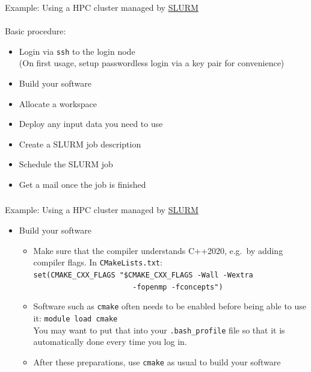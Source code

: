 \documentclass[utf8,stillsansserifmath,fleqn,t]{beamer}
\newcommand{\code}[1]{\texttt{#1}}
\begin{document}
\begin{frame}
\frametitle{\insertsection}
Example: Using a HPC cluster managed by
\href{https://slurm.schedmd.com/}{SLURM}\\
~\\
Basic procedure:
\begin{itemize}
\item Login via \code{ssh} to the login node\\
    (On first usage, setup passwordless login via a key pair for convenience)
\item Build your software
\item Allocate a workspace
\item Deploy any input data you need to use
\item Create a SLURM job description
\item Schedule the SLURM job
\item Get a mail once the job is finished
\end{itemize}
\end{frame}

\begin{frame}
\frametitle{\insertsection}
Example: Using a HPC cluster managed by
\href{https://slurm.schedmd.com/}{SLURM}
\begin{itemize}
\item Build your software
    \begin{itemize}
    \item Make sure that the compiler understands C++2020, e.g.~by adding
    compiler flags. In
    \code{CMakeLists.txt}:\\
    \code{set(CMAKE\_CXX\_FLAGS "\${CMAKE\_CXX\_FLAGS} -Wall -Wextra}\\
    \code{~~~~~~~~~~~~~~~~~~~~~~~-fopenmp -fconcepts")}
\item Software such as \code{cmake} often needs to be enabled before being able
to use it:
    \code{module load cmake}\\
    You may want to put that into your \code{.bash\_profile} file so that it is
    automatically done every time you log in.
\item After these preparations, use \code{cmake} as usual to build your software 
\end{itemize}
\end{itemize}
\end{frame}
\end{document}
